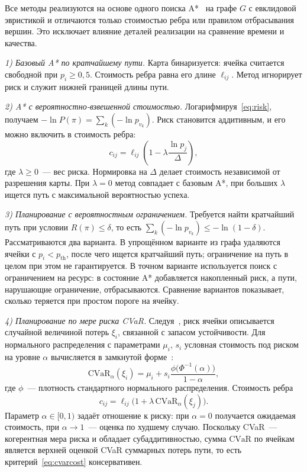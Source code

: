 \documentclass{misisarticle}
\begin{document}
Все методы реализуются на основе одного поиска A*~\cite{hart1968} на графе $G$ с евклидовой эвристикой и отличаются только стоимостью ребра или правилом отбрасывания вершин. Это исключает влияние деталей реализации на сравнение времени и качества.

\textit{1) Базовый A* по кратчайшему пути.} Карта бинаризуется: ячейка считается свободной при $p_i \ge 0{,}5$. Стоимость ребра равна его длине $\ell_{ij}$. Метод игнорирует риск и служит нижней границей длины пути.

\textit{2) A* с вероятностно-взвешенной стоимостью.} Логарифмируя~\eqref{eq:risk}, получаем $-\ln P(\pi) = \sum_k (-\ln p_{v_k})$. Риск становится аддитивным, и его можно включить в стоимость ребра:
\begin{equation}
  c_{ij} = \ell_{ij} \left(1 - \lambda \frac{\ln p_j}{\Delta}\right),
  \label{eq:wastar}
\end{equation}
где $\lambda \ge 0$~--- вес риска. Нормировка на $\Delta$ делает стоимость независимой от разрешения карты. При $\lambda = 0$ метод совпадает с базовым A*, при больших $\lambda$ ищется путь с максимальной вероятностью успеха.

\textit{3) Планирование с вероятностным ограничением.} Требуется найти кратчайший путь при условии $R(\pi) \le \delta$, то есть $\sum_k (-\ln p_{v_k}) \le -\ln(1-\delta)$. Рассматриваются два варианта. В упрощённом варианте из графа удаляются ячейки с $p_i < p_{\mathrm{th}}$, после чего ищется кратчайший путь; ограничение на путь в целом при этом не гарантируется. В точном варианте используется поиск с ограничением на ресурс: в состояние A* добавляется накопленный риск, а пути, нарушающие ограничение, отбрасываются. Сравнение вариантов показывает, сколько теряется при простом пороге на ячейку.

\textit{4) Планирование по мере риска CVaR.} Следуя~\cite{fan2021}, риск ячейки описывается случайной величиной потерь $\xi_i$, связанной с запасом устойчивости. Для нормального распределения с параметрами $\mu_i$, $s_i$ условная стоимость под риском на уровне $\alpha$ вычисляется в замкнутой форме~\cite{rockafellar2000}:
\begin{equation}
  \mathrm{CVaR}_\alpha(\xi_i) = \mu_i + s_i \frac{\phi\big(\Phi^{-1}(\alpha)\big)}{1 - \alpha},
  \label{eq:cvar}
\end{equation}
где $\phi$~--- плотность стандартного нормального распределения. Стоимость ребра
\begin{equation}
  c_{ij} = \ell_{ij} \big(1 + \lambda\, \mathrm{CVaR}_\alpha(\xi_j)\big).
  \label{eq:cvarcost}
\end{equation}
Параметр $\alpha \in [0, 1)$ задаёт отношение к риску: при $\alpha = 0$ получается ожидаемая стоимость, при $\alpha \to 1$~--- оценка по худшему случаю. Поскольку CVaR~--- когерентная мера риска и обладает субаддитивностью, сумма $\mathrm{CVaR}$ по ячейкам является верхней оценкой CVaR суммарных потерь пути, то есть критерий~\eqref{eq:cvarcost} консервативен.
\end{document}
